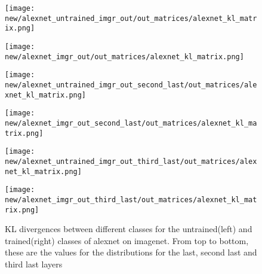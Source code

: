 \documentclass{article}
\begin{document}
            \begin{figure}[H]
                \centering
                \begin{minipage}{0.45\textwidth}
                    \centering
                    \texttt{[image: new/alexnet\_untrained\_imgr\_out/out\_matrices/alexnet\_kl\_matrix.png]}
                    
                \end{minipage}\hfill
                \begin{minipage}{0.45\textwidth}
                    \centering
                    \texttt{[image: new/alexnet\_imgr\_out/out\_matrices/alexnet\_kl\_matrix.png]}
                \end{minipage}
                \begin{minipage}{0.45\textwidth}
                    \centering
                    \texttt{[image: new/alexnet\_untrained\_imgr\_out\_second\_last/out\_matrices/alexnet\_kl\_matrix.png]}
                    
                \end{minipage}\hfill
                \begin{minipage}{0.45\textwidth}
                    \centering
                    \texttt{[image: new/alexnet\_imgr\_out\_second\_last/out\_matrices/alexnet\_kl\_matrix.png]}
                \end{minipage}
                
                \begin{minipage}{0.45\textwidth}
                    \centering
                    \texttt{[image: new/alexnet\_untrained\_imgr\_out\_third\_last/out\_matrices/alexnet\_kl\_matrix.png]}
                    
                \end{minipage}\hfill
                \begin{minipage}{0.45\textwidth}
                    \centering
                    \texttt{[image: new/alexnet\_imgr\_out\_third\_last/out\_matrices/alexnet\_kl\_matrix.png]}
                \end{minipage}
                
                \caption{KL divergences between different classes for the untrained(left) and trained(right) classes of alexnet on imagenet. From top to bottom, these are the values for the distributions for the last, second last and third last layers}
                \label{fig:kl_divergences_imgr}
            \end{figure}
            
\end{document}

